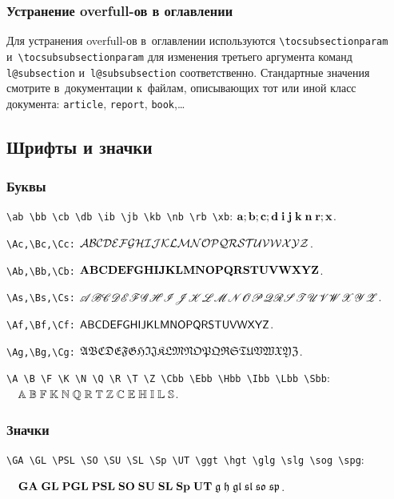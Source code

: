 \documentclass[a4paper]{article}
\begin{document}
\subsubsection{Устранение overfull-ов в оглавлении}
Для устранения overfull-ов в~оглавлении используются
\verb'\tocsubsectionparam' и~\verb'\tocsubsubsectionparam' для изменения третьего аргумента
команд \verb'l@subsection' и~\verb'l@subsubsection' соответственно. Стандартные значения смотрите
в~документации к~файлам, описывающих тот или иной класс документа: \texttt{article},
\texttt{report}, \texttt{book},\dots

\subsection{Шрифты и значки}

\subsubsection{Буквы}

\verb'\ab \bb \cb \db \ib \jb \kb \nb \rb \xb': 
$\ab; \bb; \cb; \db\; \ib\; \jb\; \kb\; \nb\; \rb; \xb$.

\verb$\Ac,\Bc,\Cc:$ $\Ac\Bc\Cc\Dc\Ec\Fc\Gc\Hc\Ic\Jc\Kc\Lc\Mc\Nc\Oc\Pc\Qc\Rc\Sc\Tc\Uc\Vc\Wc\Xc\Yc\Zc$.

\verb$\Ab,\Bb,\Cb:$ $\Ab\Bb\Cb\Db\Eb\Fb\Gb\Hb\Ib\Jb\Kb\Lb\Mb\Nb\Ob\Pb\Qb\Rb\Sb\Tb\Ub\Vb\Wb\Xb\Yb\Zb$.

\verb$\As,\Bs,\Cs:$ $\As\Bs\Cs\Ds\Es\Fs\Gs\Hs\Is\Js\Ks\Ls\Ms\Ns\Os\Ps\Qs\Rs\Ss\Ts\Us\Vs\Ws\Xs\Ys\Zs$.

\verb$\Af,\Bf,\Cf:$ $\Af\Bf\Cf\Df\Ef\Ff\Gf\Hf\If\Jf\Kf\Lf\Mf\Nf\Of\Pf\Qf\Rf\Sf\Tf\Uf\Vf\Wf\Xf\Yf\Zf$.

\verb$\Ag,\Bg,\Cg:$ $\Ag\Bg\Cg\Dg\Eg\Fg\Gg\Hg\Ig\Jg\Kg\Lg\Mg\Ng\Og\Pg\Qg\Rg\Sg\Tg\Ug\Vg\Wg\Xg\Yg\Zg$.

\verb$\A \B \F \K \N \Q \R \T \Z \Cbb \Ebb \Hbb \Ibb \Lbb \Sbb$:
$\quad\A\;\B\;\F\;\K\;\N\;\Q\;\R\;\T\;\Z\;\Cbb\;\Ebb\;\Hbb\;\Ibb\;\Lbb\;\Sbb$.

\subsubsection{Значки}

\verb$\GA \GL \PSL \SO \SU \SL \Sp \UT \ggt \hgt \glg \slg \sog \spg$:

$\quad\GA\;\GL\;\PGL\;\PSL\;\SO\;\SU\;\SL\;\Sp\;\UT\;\ggt\;\hgt\;\glg\;\slg\;\sog\;\spg$.

\medskip
\end{document}
